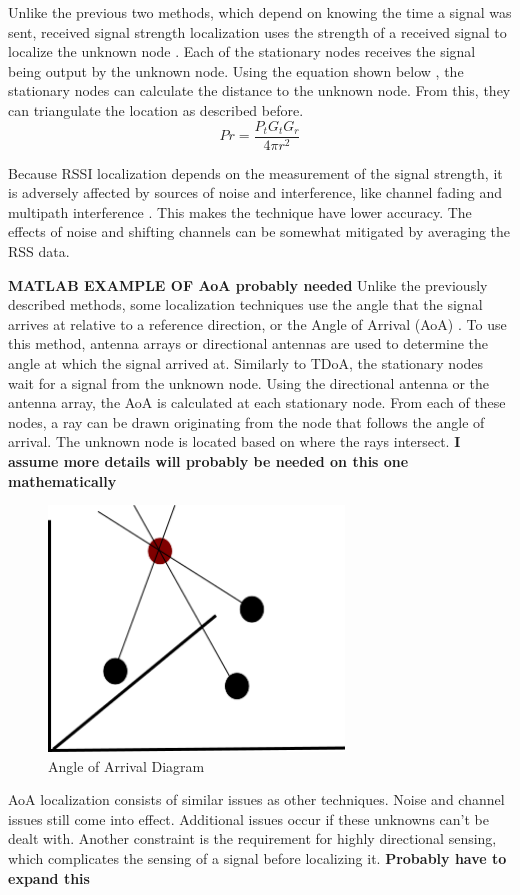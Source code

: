 Unlike the previous two methods, which depend on knowing the time a signal was sent, received signal strength localization uses the strength of a received signal to localize the unknown node \cite{local_conf}. Each of the stationary nodes receives the signal being output by the unknown node. Using the equation shown below \cite{rss_calc}, the stationary nodes can calculate the distance to the unknown node. From this, they can triangulate the location as described before.
\[Pr = \frac{P_t G_t G_r}{4πr^2} \]\par
Because RSSI localization depends on the measurement of the signal strength, it is adversely affected by sources of noise and interference, like channel fading and multipath interference \cite{local_conf}. This makes the technique have lower accuracy. The effects of noise and shifting channels can be somewhat mitigated by averaging the RSS data.

\textbf{MATLAB EXAMPLE OF AoA probably needed}
Unlike the previously described methods, some localization techniques use the angle that the signal arrives at relative to a reference direction, or the Angle of Arrival (AoA) \cite{local_aoa}. To use this method, antenna arrays or directional antennas are used to determine the angle at which the signal arrived at. Similarly to TDoA, the stationary nodes wait for a signal from the unknown node. Using the directional antenna or the antenna array, the AoA is calculated at each stationary node. From each of these nodes, a ray can be drawn originating from the node that follows the angle of arrival. The unknown node is located based on where the rays intersect.
\textbf{I assume more details will probably be needed on this one mathematically}
\begin{figure}[ht]
\centering
\includegraphics[width=0.70\textwidth]{img/path4188.png}
\caption{Angle of Arrival Diagram}
\label{fig:aoa_diagram}
\end{figure}\par
AoA localization consists of similar issues as other techniques. Noise and channel issues still come into effect. Additional issues occur if these unknowns can’t be dealt with. Another constraint is the requirement for highly directional sensing, which complicates the sensing of a signal before localizing it. \textbf{Probably have to expand this}

